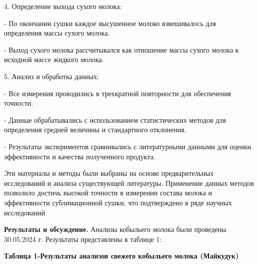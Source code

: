 4. Определение выхода сухого молока:

- По окончании сушки каждое высушенное молоко взвешивалось для
определения массы сухого молока.

- Выход сухого молока рассчитывался как отношение массы сухого молока к
исходной массе жидкого молока.

5. Анализ и обработка данных:

- Все измерения проводились в трехкратной повторности для обеспечения
точности.

- Данные обрабатывались с использованием статистических методов для
определения средней величины и стандартного отклонения.

- Результаты экспериментов сравнивались с литературными данными для
оценки эффективности и качества полученного продукта.

Эти материалы и методы были выбраны на основе предварительных
исследований и анализа существующей литературы. Применение данных
методов позволило достичь высокой точности в измерении состава молока и
эффективности сублимационной сушки, что подтверждено в ряде научных
исследований

{\bfseries Результаты и обсуждение.} Анализы кобыльего молока были
проведены 30.05.2024 г. Результаты представлены в таблице 1:

{\bfseries Таблица 1-Результаты анализов свежего кобыльего молока
(Майкудук)}

